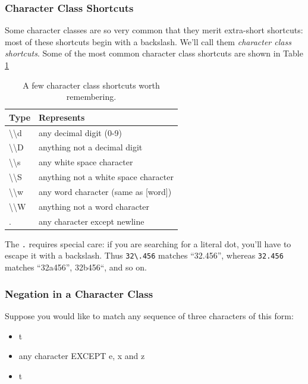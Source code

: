 \documentclass[]{book}
\providecommand{\tightlist}{%
  \setlength{\itemsep}{0pt}\setlength{\parskip}{0pt}}
\theoremstyle{definition}
\theoremstyle{definition}
\theoremstyle{remark}
\begin{document}
{\subsubsection{Character Class
Shortcuts}\label{character-class-shortcuts}

Some character classes are so very common that they merit extra-short
shortcuts: most of these shortcuts begin with a backslash. We'll call
them \emph{character class shortcuts}. 
Some of the most common character class shortcuts are shown in Table
\ref{tab:character-types}

\begin{table}

\caption{\label{tab:character-types}A few character class shortcuts worth remembering.}
\centering
\begin{tabular}[t]{l|l}
\hline
Type & Represents\\
\hline
\textbackslash{}\textbackslash{}d & any decimal digit (0-9)\\
\hline
\textbackslash{}\textbackslash{}D & anything not a decimal digit\\
\hline
\textbackslash{}\textbackslash{}s & any white space character\\
\hline
\textbackslash{}\textbackslash{}S & anything not a white space character\\
\hline
\textbackslash{}\textbackslash{}w & any word character (same as [word])\\
\hline
\textbackslash{}\textbackslash{}W & anything not a word character\\
\hline
. & any character except newline\\
\hline
\end{tabular}
\end{table}

The \texttt{.} requires special care: if you are searching for a literal
dot, you'll have to escape it with a backslash. Thus
\texttt{32\textbackslash{}.456} matches ``32.456'', whereas
\texttt{32.456} matches ``32a456'', 32b456``, and so on.

\subsubsection{Negation in a Character
Class}\label{negation-in-a-character-class}

Suppose you would like to match any sequence of three characters of this
form:

\begin{itemize}
\tightlist
\item
  t
\item
  any character EXCEPT e, x and z
\item
  t
\end{itemize}

}
\end{document}
